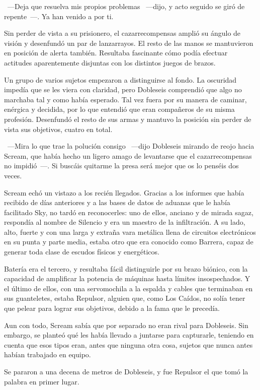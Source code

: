 ~---Deja que resuelva mis propios problemas ~---dijo, y acto seguido se giró de repente~---. Ya han venido a por ti.

Sin perder de vista a su prisionero, el cazarrecompensas amplió su ángulo de visión y desenfundó un par de lanzarrayos. El resto de las manos se mantuvieron en posición de alerta también. Resultaba fascinante cómo podía efectuar actitudes aparentemente disjuntas con los distintos juegos de brazos.

Un grupo de varios sujetos empezaron a distinguirse al fondo. La oscuridad impedía que se les viera con claridad, pero Dobleseis comprendió que algo no marchaba tal y como había esperado. Tal vez fuera por su manera de caminar, enérgica y decidida, por lo que entendió que eran compañeros de su misma profesión. Desenfundó el resto de sus armas y mantuvo la posición sin perder de vista sus objetivos, cuatro en total.

~---Mira lo que trae la polución consigo ~---dijo Dobleseis mirando de reojo hacia Scream, que había hecho un ligero amago de levantarse que el cazarrecompensas no impidió~---. Si buscáis quitarme la presa será mejor que os lo penséis dos veces.

Scream echó un vistazo a los recién llegados. Gracias a los informes que había recibido de días anteriores y a las bases de datos de aduanas que le había facilitado Sky, no tardó en reconocerles: uno de ellos, anciano y de mirada sagaz, respondía al nombre de Silencio y era un maestro de la infiltración. A su lado, alto, fuerte y con una larga y extraña vara metálica llena de circuitos electrónicos en su punta y parte media, estaba otro que era conocido como Barrera, capaz de generar toda clase de escudos físicos y energéticos.

Batería era el tercero, y resultaba fácil distinguirle por su brazo biónico, con la capacidad de amplificar la potencia de máquinas hasta límites insospechados. Y el último de ellos, con una servomochila a la espalda y cables que terminaban en sus guanteletes, estaba Repulsor, alguien que, como Los Caídos, no solía tener que pelear para lograr sus objetivos, debido a la fama que le precedía.

Aun con todo, Scream sabía que por separado no eran rival para Dobleseis. Sin embargo, se planteó qué les había llevado a juntarse para capturarle, teniendo en cuenta que esos tipos eran, antes que ninguna otra cosa, sujetos que nunca antes habían trabajado en equipo.

Se pararon a una decena de metros de Dobleseis, y fue Repulsor el que tomó la palabra en primer lugar.

